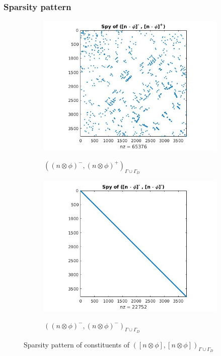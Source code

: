 \documentclass{beamer}
\begin{document}
\begin{frame}
\frametitle{Sparsity pattern}

\begin{figure}
    \begin{subfigure}{0.45\textwidth}
    \includegraphics[width=\linewidth]{figure23.jpg}
    \label{fig:figure23}
	\caption{$((n \otimes \phi)^-,(n \otimes \phi)^+)_{\Gamma \cup \Gamma_D}$}      
  \end{subfigure}
    \begin{subfigure}{0.45\textwidth}
    \includegraphics[width=\textwidth]{figure24.jpg}
    \label{fig:figure24}
	\caption{$((n \otimes \phi)^-,(n \otimes \phi)^-)_{\Gamma \cup \Gamma_D}$}      
  \end{subfigure}
\caption{Sparsity pattern of constituents of $([n \otimes \phi],[n \otimes \phi])_{\Gamma \cup \Gamma_D}$}
\label{figure_2_all}
\end{figure}

\end{frame}
\end{document}
